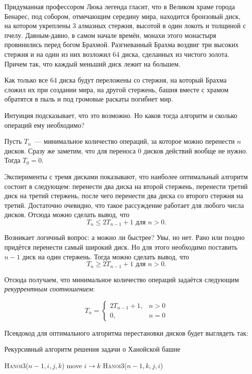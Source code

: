 Придуманная профессором Люка легенда гласит, что в Великом храме города Бенарес, под собором, отмечающим середину мира, находится бронзовый диск, на котором укреплены 3 алмазных стержня, высотой в один локоть и толщиной с пчелу. Давным-давно, в самом начале времён, монахи этого монастыря провинились перед богом Брахмой. Разгневанный Брахма воздвиг три высоких стержня и на один из них возложил 64 диска, сделанных из чистого золота. Причем так, что каждый меньший диск лежит на большем.

Как только все 64 диска будут переложены со стержня, на который Брахма сложил их при создании мира, на другой стержень, башня вместе с храмом обратятся в пыль и под громовые раскаты погибнет мир.

Интуиция подсказывает, что это возможно. Но каков тогда алгоритм и сколько операций ему необходимо?

Пусть \(T_n\)~--- минимальное количество операций, за которое можно перенести \(n\) дисков. Сразу же заметим, что для переноса 0 дисков действий вообще не нужно. Тогда \(T_0 = 0\).

Эксперименты с тремя дисками показывают, что наиболее оптимальный алгоритм состоит в следующем: перенести два диска на второй стержень, перенести третий диск на третий стержень, после чего перенести два диска со второго стержня на третий. Достаточно очевидно, что такое рассуждение работает для любого числа дисков. Отсюда можно сделать вывод, что \[T_n \leqslant 2T_{n - 1} + 1\text{ для } n > 0.\]

Возникает логичный вопрос: а можно ли быстрее? Увы, но нет. Рано или поздно придётся перенести самый широкий диск. Но для этого необходимо поставить \(n - 1\) диск на один стержень. Тогда можно сделать вывод, что \[T_n \geqslant 2T_{n - 1} + 1\text{ для } n > 0.\]

Отсюда получаем, что минимальное количество операций задаётся следующим \emph{рекуррентным соотношением}:

\[T_n = \begin{cases}
2T_{n - 1} + 1, & n > 0 \\
0, & n = 0
\end{cases}\]

Псевдокод для оптимального алгоритма перестановки дисков будет выглядеть так:

\begin{algorithm}[H]
	\caption{Рекурсивный алгоритм решения задачи о Ханойской башне}
	\begin{algorithmic}[1]
		\State \textsc{Hanoi3}($n-1,i,j,k$)
		\State move $i \to k$
		\State \textsc{Hanoi3}($n-1,k,j,i$)
		\EndIf
		\EndFunction
	\end{algorithmic}
\end{algorithm}

